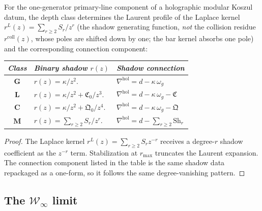 \begin{theorem}
\label{thm:thqg-holographic-type}
\ClaimStatusProvedHere
{}
For the one-generator primary-line component of a holographic
modular Koszul datum, the depth class determines the Laurent
profile of the Laplace kernel $r^L(z) = \sum_{r \geq 2} S_r/z^r$
(the shadow generating function, \emph{not} the collision residue
$r^{\mathrm{coll}}(z)$, whose poles are shifted down by one;
the bar kernel absorbs one pole) and the corresponding
connection component:
\begin{center}
\small
\renewcommand{\arraystretch}{1.25}
\begin{tabular}{c@{\quad}l@{\quad}l}
\toprule
\emph{Class} & \emph{Binary shadow $r(z)$} &
\emph{Shadow connection} \\
\midrule
$\mathbf{G}$ &
 $r(z) = \kappa/z^2$. &
 $\nabla^{\mathrm{hol}} = d - \kappa\,\omega_g$ \\
$\mathbf{L}$ &
 $r(z) = \kappa/z^2 + \mathfrak{C}_0/z^3$. &
 $\nabla^{\mathrm{hol}} = d - \kappa\,\omega_g -
 \mathfrak{C}$ \\
$\mathbf{C}$ &
 $r(z) = \kappa/z^2 + \mathfrak{Q}_0/z^4$. &
 $\nabla^{\mathrm{hol}} = d - \kappa\,\omega_g -
 \mathfrak{Q}$ \\
$\mathbf{M}$ &
 $r(z) = \sum_{r\geq 2} S_r/z^r$. &
 $\nabla^{\mathrm{hol}} = d -
 \sum_{r\geq 2} \mathrm{Sh}_r$ \\
\bottomrule
\end{tabular}
\end{center}
\end{theorem}

\begin{proof}
The Laplace kernel $r^L(z) = \sum_{r \geq 2} S_r z^{-r}$
receives a degree-$r$ shadow coefficient as the $z^{-r}$ term.
Stabilization at $r_{\max}$ truncates the Laurent expansion.
The connection component listed in the table is the same shadow
data repackaged as a one-form, so it follows the same
degree-vanishing pattern.
\end{proof}



\subsection{The $\mathcal{W}_\infty$ limit}
\label{subsec:thqg-winfty-limit}

